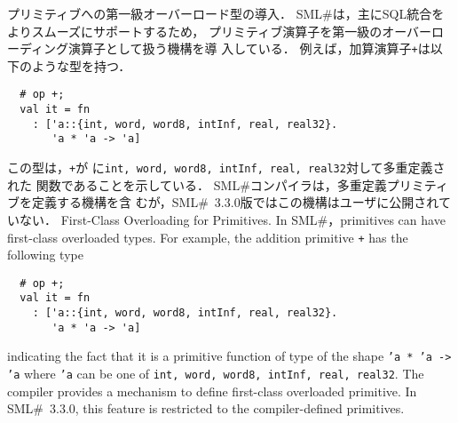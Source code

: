 \documentclass{jbook}
\newcommand{\smlsharp}{SML\#}
\newcommand{\version}{3.3.0}
\begin{document}
\begin{itemize}
\ifjp%
	プリミティブへの第一級オーバーロード型の導入．
	\smlsharp{}は，主にSQL統合をよりスムーズにサポートするため，
プリミティブ演算子を第一級のオーバーローディング演算子として扱う機構を導
入している．
	例えば，加算演算子{\tt +}は以下のような型を持つ．
\begin{verbatim}
  # op +;
  val it = fn
    : ['a::{int, word, word8, intInf, real, real32}.
       'a * 'a -> 'a]
\end{verbatim}
	この型は，{\tt +}が
に{\tt int, word, word8, intInf, real, real32}対して多重定義された
関数であることを示している．
	\smlsharp{}コンパイラは，多重定義プリミティブを定義する機構を含
むが，\smlsharp{}~\version{}版ではこの機構はユーザに公開されていない．
\else%
	First-Class Overloading for Primitives.
	In \smlsharp{}，primitives can have first-class overloaded
types.
	For example, the addition primitive {\tt +} has the following type
\begin{verbatim}
  # op +;
  val it = fn
    : ['a::{int, word, word8, intInf, real, real32}.
       'a * 'a -> 'a]
\end{verbatim}
indicating the fact that it is a primitive function of type of
the shape {\tt 'a * 'a -> 'a} where {\tt 'a} can be one of
{\tt int, word, word8, intInf, real, real32}.
	The compiler provides a mechanism to define first-class
overloaded primitive.
	In \smlsharp{}~\version{}, this feature is restricted 
to the compiler-defined primitives.
\fi%
\end{itemize}
\end{document}
